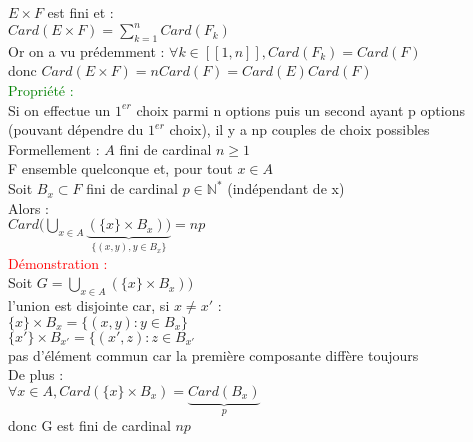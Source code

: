 \documentclass{article}
\begin{document}
$E \times F$ est fini et : \\
$Card(E\times F)= \sum_{k=1}^n Card(F_k)$ \\
Or on a vu prédemment : $\forall k \in [[1,n]], Card(F_k)=Card(F)$ \\
donc $Card(E \times F) = n Card(F)=Card(E) Card(F)$ \\
\textcolor{green}{Propriété :} \\
Si on effectue un $1^{er}$ choix parmi n options puis un second ayant p options (pouvant dépendre du $1^{er}$ choix), il y a np couples de choix possibles \\
Formellement : $A$ fini de cardinal $n \geq 1$ \\
F ensemble quelconque et, pour tout $x \in A$ \\
Soit $B_x \subset F$ fini de cardinal $p \in \mathbb N^*$ (indépendant de x) \\
Alors : \\
$Card ( \bigcup_{x \in A}\underbrace{(\lbrace x \rbrace \times B_x))}_{\lbrace (x,y),y\in B_x \rbrace}=np$ \\
\textcolor{red}{Démonstration :} \\
Soit $G= \bigcup_{x \in A} {(\lbrace x \rbrace \times B_x))}$ \\
l'union est disjointe car, si $x \neq x'$ : \\
$\lbrace x \rbrace \times B_x = \lbrace (x,y) : y\in B_x \rbrace $ \\
$ \lbrace x' \rbrace \times B_{x'}=\lbrace (x',z) : z \in B_{x'}$ \\
pas d'élément commun car la première composante diffère toujours \\
De plus : \\
$\forall x \in A, Card(\lbrace x \rbrace \times B_x)= \underbrace{Card(B_x)}_{p}$ \\
donc G est fini de cardinal $np$
\end{document}
